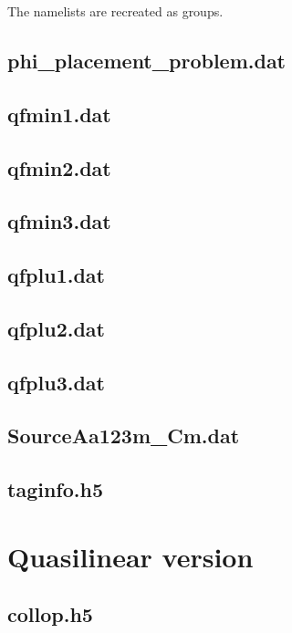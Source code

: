 The namelists are recreated as groups.

\subsection{phi\_placement\_problem.dat}

\subsection{qfmin1.dat}
\subsection{qfmin2.dat}
\subsection{qfmin3.dat}
\subsection{qfplu1.dat}
\subsection{qfplu2.dat}
\subsection{qfplu3.dat}

\subsection{SourceAa123m\_Cm.dat}

\subsection{taginfo.h5}

\section{Quasilinear version}

\subsection{collop.h5}

